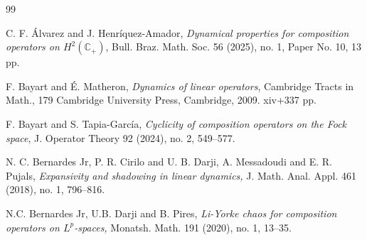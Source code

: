 \documentclass[11pt]{amsart}%
\numberwithin{equation}{section}
\theoremstyle{plain}
\theoremstyle{definition}
\theoremstyle{definition}
\newcommand{\hb}{\mathbb{C}_+}
\begin{document}
\begin{thebibliography}{99}  
		              




 C. F. Álvarez and J. Henríquez-Amador, \emph{
Dynamical properties for composition operators on $H^2(\hb)$},
Bull. Braz. Math. Soc. 56 (2025), no. 1, Paper No. 10, 13 pp.

 F. Bayart and É. Matheron, \emph{
Dynamics of linear operators},
Cambridge Tracts in Math., 179
Cambridge University Press, Cambridge, 2009. xiv+337 pp.


 F. Bayart and S. Tapia-García, \emph{
Cyclicity of composition operators on the Fock space},
J. Operator Theory 92 (2024), no. 2, 549–577.


 N. C. Bernardes Jr, P. R. Cirilo and U.  B. Darji, A. Messadoudi and E. R. Pujals, 
\emph{Expansivity and shadowing in linear dynamics,} J. Math. Anal. Appl.   461 (2018), no. 1, 796–816.

 N.C. Bernardes Jr, U.B. Darji and B. Pires, \emph{Li-Yorke chaos for composition operators on $L^p$-spaces,} Monatsh. Math.   191 (2020), no. 1, 13–35.


		

\end{thebibliography}
\end{document}
